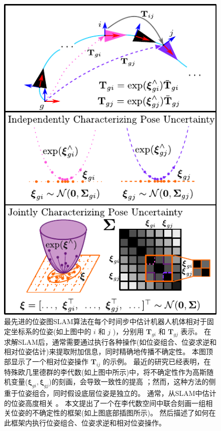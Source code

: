 
\begin{figure}[t!]
    \centering
    \includegraphics[width=0.9\columnwidth]{figures/main-example2.pdf}
    \caption{
    最先进的位姿图SLAM算法在每个时间步中估计机器人机体相对于固定坐标系的位姿(如上图中的 $i$ 和 $j$ )，分别用 $\mathbf{T}_{gi}$ 和 $\mathbf{T}_{gj}$ 表示。 
    在求解SLAM后，通常需要通过执行各种操作(如位姿组合、位姿求逆和相对位姿估计)来提取附加信息，同时精确地传播不确定性。
    本图顶部显示了一个相对位姿操作 $\mathbf{T}_{ij}$ 的示例。
    最近的研究已经表明，在特殊欧几里德群的李代数(如上图中所示)中，将不确定性作为高斯随机变量($\boldsymbol{\xi}_{gi}, \boldsymbol{\xi}_{gj}$)的刻画，会导致一致性的提高 \cite{barfoot2014associating}；然而，这种方法的侧重于位姿组合，同时假设底层位姿是独立的。
    通常，从SLAM中估计的位姿高度相关 \cite{dissanayake2001a}。
    本文提出了一个在李代数空间中联合刻画一组相关位姿的不确定性的框架(如上图底部插图所示)。 
    然后描述了如何在此框架内执行位姿组合、位姿求逆和相对位姿操作。}
    \label{fig:main_example}
\end{figure}

